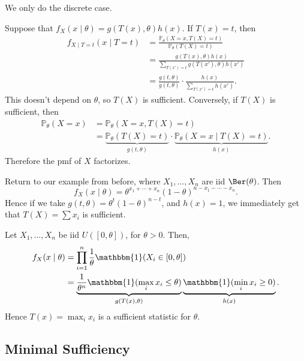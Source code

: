 \documentclass[12pt]{article}
\begin{document}
\begin{proofbox}
	We only do the discrete case.

	Suppose that $f_X(x\mid \theta) = g(T(x),\theta) h(x)$. If $T(x) = t$, then
	\begin{align*}
		f_{X \mid T=t}(x \mid T = t) &= \frac{\mathbb{P}_\theta(X = x, T(X) = t)}{\mathbb{P}_\theta(T(X) = t)} \\
					       &= \frac{g(T(x), \theta)h(x)}{\sum_{T(x') = t} g(T(x'),\theta) h(x')} \\
					       &= \frac{g(t, \theta)}{g(t, \theta)} \cdot \frac{h(x)}{\sum_{T(x') = t} h(x')}.
	\end{align*}
	This doesn't depend on $\theta$, so $T(X)$ is sufficient. Conversely, if $T(X)$ is sufficient, then
	\begin{align*}
		\mathbb{P}_\theta(X = x) &= \mathbb{P}_\theta(X=x, T(X) = t) \\
					 &= \underbrace{\mathbb{P}_\theta(T(X) = t)}_{g(t, \theta)} \cdot \underbrace{\mathbb{P}_\theta(X = x \mid T(X) = t)}_{h(x)}.
	\end{align*}
	Therefore the pmf of $X$ factorizes.
\end{proofbox}

\begin{exbox}
	Return to our example from before, where $X_1, \ldots, X_n$ are iid $\Ber(\theta)$. Then
	\[
	f_X(x \mid \theta) = \theta^{x_1+ \cdots + x_n} (1 - \theta)^{n - x_1 - \cdots - x_n}
	.\]
	Hence if we take $g(t, \theta) = \theta^{t}(1-\theta)^{n-t}$, and $h(x) = 1$, we immediately get that $T(X) = \sum x_i$ is sufficient.
\end{exbox}

\begin{exbox}
	Let $X_1, \ldots, X_n$ be iid $U([0, \theta])$, for $\theta > 0$. Then,
	\begin{align*}
		f_X(x\mid \theta) &= \prod_{i = 1}^{n} \frac{1}{\theta} \mathbbm{1}(X_i \in [0, \theta]) \\
				  &= \underbrace{\frac{1}{\theta^{n}} \mathbbm{1} (\max_{i} x_i \leq \theta)}_{g(T(x), \theta)} \underbrace{\mathbbm{1} (\min_{i} x_i \geq 0)}_{h(x)}.
	\end{align*}
	Hence $T(x) = \max_{i} x_i$ is a sufficient statistic for $\theta$.
\end{exbox}

\subsection{Minimal Sufficiency}
\label{sub:minimal_sufficiency}
\end{document}
